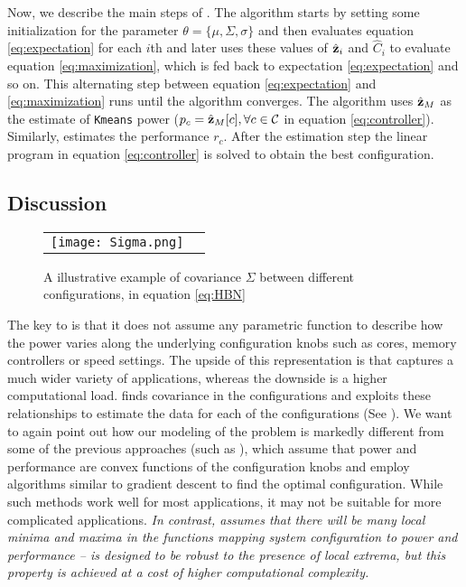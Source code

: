 Now, we describe the main steps of \SYSTEM{}. The algorithm starts by
setting some initialization for the parameter $\theta = \{\mu, \Sigma,
\sigma\}$ and then evaluates equation \eqref{eq:expectation} for each
$i$th and later uses these values of $\hat{\mathbf{z}}_i$ and $\hat{C}_i$ to
evaluate equation \eqref{eq:maximization}, which is fed back to
expectation \eqref{eq:expectation} and so on. This alternating step
between equation \eqref{eq:expectation} and \eqref{eq:maximization}
runs until the algorithm converges. The algorithm uses $\hat{\mathbf{z}}_M$ as
the estimate of \texttt{Kmeans} power (\ie $p_c = \hat{\mathbf{z}}_M[c],
\forall c \in \mathcal{C}$ in equation \eqref{eq:controller}).
Similarly, \SYSTEM{} estimates the performance $r_c$. After the
estimation step the linear program in equation \eqref{eq:controller}
is solved to obtain the best configuration.

\subsection{Discussion}

\begin{figure}
\begin{center}
\begin{tabular}[h]{cc}\hspace*{-15pt}     
	 \texttt{[image: Sigma.png]}	 
\end{tabular}
\end{center}
\vspace{-1.46em}
\caption{A illustrative example of covariance $\Sigma$  between different configurations, in equation \eqref{eq:HBN}}
\label{fig:Sigma}
\end{figure}

The key to \SYSTEM{} is that it does not assume any parametric
function to describe how the power varies along the underlying
configuration knobs such as cores, memory controllers or speed
settings. The upside of this representation is that \SYSTEM{} captures
a much wider variety of applications, whereas the downside is a higher
computational load. \SYSTEM{} finds covariance in the configurations
and exploits these relationships to estimate the data for each of the
configurations (See ). We want to again point out
how our modeling of the problem is markedly different from some of
the previous approaches (such as \cite{deng2012coscale}), which assume
that power and performance are convex functions of the configuration
knobs and employ algorithms similar to gradient descent to find the
optimal configuration. While such methods work well for most
applications, it may not be suitable for more complicated
applications. \emph{In contrast, \SYSTEM{} assumes that there will be
  many local minima and maxima in the functions mapping system
  configuration to power and performance -- \SYSTEM{} is designed to be
  robust to the presence of local extrema, but this property is achieved at a cost of
  higher computational complexity.}

